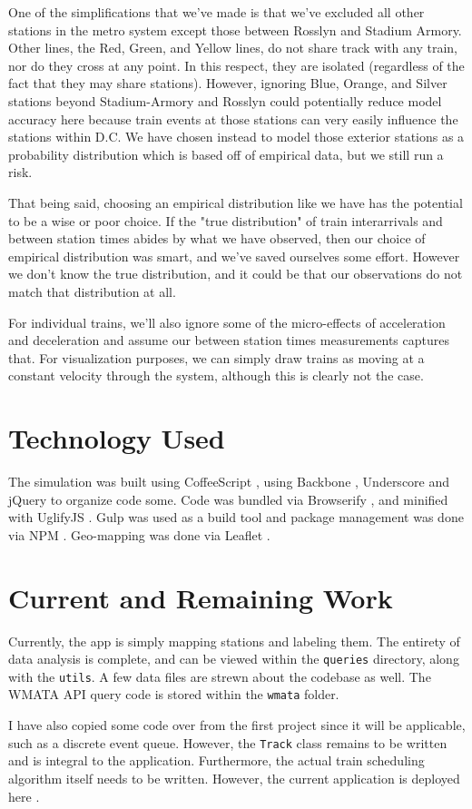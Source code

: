 \documentclass[a4paper,12pt]{article}
\begin{document}
One of the simplifications that we've made is that we've excluded all other stations in the metro system except those
between Rosslyn and Stadium Armory. Other lines, the Red, Green, and Yellow lines, do not share track with any train,
nor do they cross at any point. In this respect, they are isolated (regardless of the fact that they may share
stations). However, ignoring Blue, Orange, and Silver stations beyond Stadium-Armory and Rosslyn could potentially
reduce model accuracy here because train events at those stations can very easily influence the stations within D.C.
We have chosen instead to model those exterior stations as a probability distribution which is based off of empirical
data, but we still run a risk.

That being said, choosing an empirical distribution like we have has the potential to be a wise or poor choice. If the
"true distribution" of train interarrivals and between station times abides by what we have observed, then our choice
of empirical distribution was smart, and we've saved ourselves some effort. However we don't know the true
distribution, and it could be that our observations do not match that distribution at all.

For individual trains, we'll also ignore some of the micro-effects of acceleration and deceleration and assume our
between station times measurements captures that. For visualization purposes, we can simply draw trains as moving at a
constant velocity through the system, although this is clearly not the case.

\section{Technology Used}
The simulation was built using CoffeeScript \cite{coffeescript}, using Backbone \cite{backbone}, Underscore
\cite{underscore} and jQuery \cite{jQuery} to organize code some. Code was bundled via Browserify \cite{browserify},
and minified with UglifyJS \cite{uglify}. Gulp \cite{gulp} was used as a build tool and package management was done
via NPM \cite{npm}. Geo-mapping was done via Leaflet \cite{leaflet}.

\section{Current and Remaining Work}
Currently, the app is simply mapping stations and labeling them. The entirety of data analysis is complete, and can be
viewed within the \texttt{queries} directory, along with the \texttt{utils}. A few data files are strewn about the
codebase as well. The WMATA API query code is stored within the \texttt{wmata} folder.

I have also copied some code over from the first project since it will be applicable, such as a discrete event queue.
However, the \texttt{Track} class remains to be written and is integral to the application. Furthermore, the actual
train scheduling algorithm itself needs to be written. However, the current application is deployed here
\cite{aprilandchip}.



\end{document}
